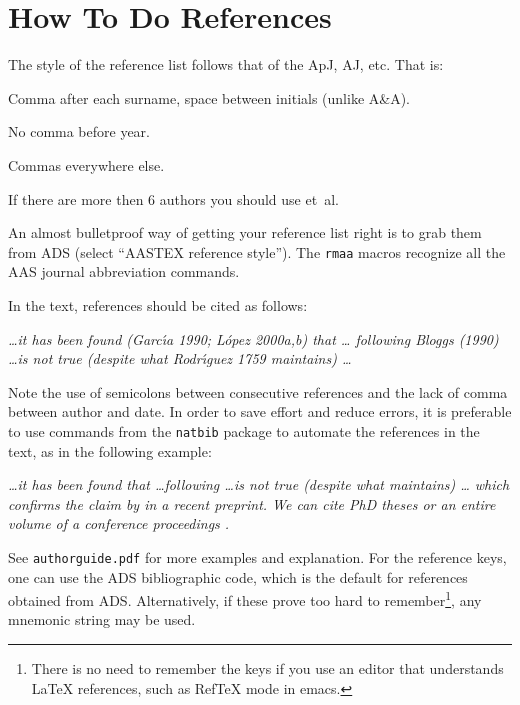 \documentclass[debug]{rmxaa}
\newenvironment{Example}
{\begin{list}{}{\setlength{\leftmargin}{10pt}\setlength{\rightmargin}{10pt}}%
  \item[]\itshape}
  {\end{list}}
\begin{document}
\section{How To Do References}
\label{sec:refs}

The style of the reference list follows that of the ApJ, AJ, etc. That
is:
\begin{compactitem}
\item Comma after each surname, space between initials (unlike A\&A).
\item No comma before year.
\item Commas everywhere else. 
\item If there are more then 6 authors you should use et~al.
\end{compactitem}
An almost bulletproof way of getting your reference list right is to
grab them from ADS (select ``AASTEX reference style''). The
\texttt{rmaa} macros recognize all the AAS journal abbreviation
commands. 

In the text, references should be cited as follows: 
\begin{Example}
  \dots it has been found (Garc\'\i{}a 1990; L\'opez 2000a,b) that \dots
  following Bloggs (1990) \dots is not true (despite what
  Rodr\'\i{}guez 1759 maintains) \dots
\end{Example}
Note the use of semicolons between consecutive references and the lack
of comma between author and date. In order to save effort and reduce
errors, it is preferable to use commands from the \texttt{natbib}
package to automate the references in the text, as in the following
example:
\begin{Example}
  \dots it has been found \citep{Arthur:2006a, Lazarian:2019a,
    Alarie:2019a} that \dots following \citet{Baldwin:1991a} \dots is
  not true (despite what \citealp{Stromgren:1939a} maintains) \dots
  which confirms the claim by \citeauthor{Chau-Giang:2019a} in a
  recent preprint. We can cite PhD theses \citep{Brookes:2016a,
    Kaplan:2017b} or an entire volume of a conference proceedings
  \citep{2002RMxAC..13.....H}.
\end{Example}
See \texttt{authorguide.pdf} for more examples and explanation.  For
the reference keys, one can use the ADS bibliographic code, which is
the default for references obtained from ADS. Alternatively, if these
prove too hard to remember\footnote{There is no need to remember the
  keys if you use an editor that understands \LaTeX{} references, such
  as RefTeX mode in emacs.}, any mnemonic string may be used.
\end{document}
